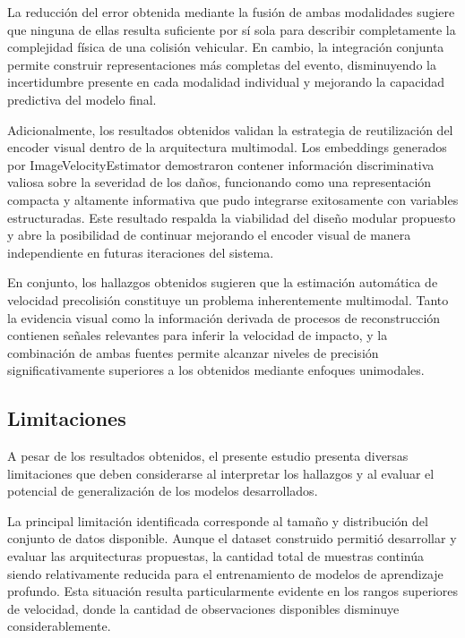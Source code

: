 \documentclass[esp]{SpeedEstimationAI_paper}
\begin{document}
La reducción del error obtenida mediante la fusión de ambas modalidades sugiere que ninguna de ellas resulta suficiente por sí sola para describir completamente la complejidad física de una colisión vehicular. En cambio, la integración conjunta permite construir representaciones más completas del evento, disminuyendo la incertidumbre presente en cada modalidad individual y mejorando la capacidad predictiva del modelo final.

Adicionalmente, los resultados obtenidos validan la estrategia de reutilización del encoder visual dentro de la arquitectura multimodal. Los embeddings generados por ImageVelocityEstimator demostraron contener información discriminativa valiosa sobre la severidad de los daños, funcionando como una representación compacta y altamente informativa que pudo integrarse exitosamente con variables estructuradas. Este resultado respalda la viabilidad del diseño modular propuesto y abre la posibilidad de continuar mejorando el encoder visual de manera independiente en futuras iteraciones del sistema.

En conjunto, los hallazgos obtenidos sugieren que la estimación automática de velocidad precolisión constituye un problema inherentemente multimodal. Tanto la evidencia visual como la información derivada de procesos de reconstrucción contienen señales relevantes para inferir la velocidad de impacto, y la combinación de ambas fuentes permite alcanzar niveles de precisión significativamente superiores a los obtenidos mediante enfoques unimodales.

\subsection{Limitaciones}

A pesar de los resultados obtenidos, el presente estudio presenta diversas limitaciones que deben considerarse al interpretar los hallazgos y al evaluar el potencial de generalización de los modelos desarrollados.

La principal limitación identificada corresponde al tamaño y distribución del conjunto de datos disponible. Aunque el dataset construido permitió desarrollar y evaluar las arquitecturas propuestas, la cantidad total de muestras continúa siendo relativamente reducida para el entrenamiento de modelos de aprendizaje profundo. Esta situación resulta particularmente evidente en los rangos superiores de velocidad, donde la cantidad de observaciones disponibles disminuye considerablemente.
\end{document}
